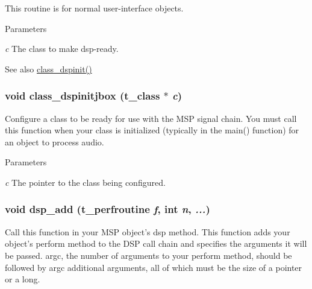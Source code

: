 This routine is for normal user-\/interface objects.


\begin{DoxyParams}{Parameters}
\item[{\em c}]The class to make dsp-\/ready. \end{DoxyParams}
\begin{DoxySeeAlso}{See also}
\hyperlink{group__msp_ga7427ae73a2ad71a1b4ef1bee2fd432fc}{class\_\-dspinit()} 
\end{DoxySeeAlso}
\hypertarget{group__msp_gab9219b764ce65abb21bec0ea54538c14}{
\subsubsection[{class\_\-dspinitjbox}]{\setlength{\rightskip}{0pt plus 5cm}void class\_\-dspinitjbox ({\bf t\_\-class} $\ast$ {\em c})}}
\label{group__msp_gab9219b764ce65abb21bec0ea54538c14}


Configure a class to be ready for use with the MSP signal chain. You must call this function when your class is initialized (typically in the main() function) for an object to process audio.


\begin{DoxyParams}{Parameters}
\item[{\em c}]The pointer to the class being configured. \end{DoxyParams}
\hypertarget{group__msp_gae9a75fa230b1db6d8316405d4a6065cc}{
\subsubsection[{dsp\_\-add}]{\setlength{\rightskip}{0pt plus 5cm}void dsp\_\-add ({\bf t\_\-perfroutine} {\em f}, \/  int {\em n}, \/   {\em ...})}}
\label{group__msp_gae9a75fa230b1db6d8316405d4a6065cc}


Call this function in your MSP object's dsp method. This function adds your object's perform method to the DSP call chain and specifies the arguments it will be passed. argc, the number of arguments to your perform method, should be followed by argc additional arguments, all of which must be the size of a pointer or a long.


